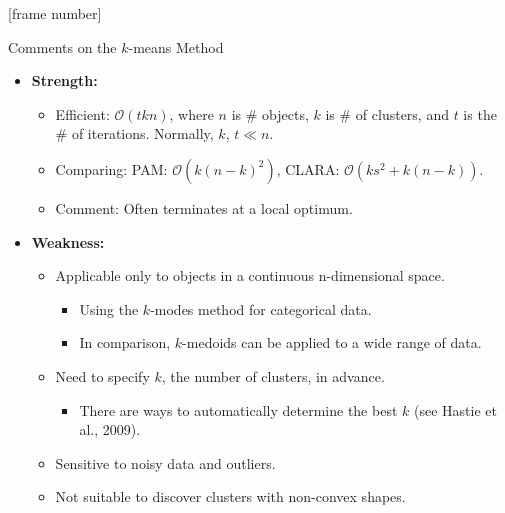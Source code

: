 \documentclass[aspectratio=169,t,xcolor=dvipsnames]{beamer}
\begin{document}
  {
    [frame number]
    \begin{frame}{Comments on the $k$-means Method}
      \begin{itemize}
        \item \textbf{Strength:}
        \begin{itemize}
          \item Efficient: $\mathcal{O}(tkn)$, where $n$ is $\#$ objects, $k$ is $\#$ of clusters, and $t$ is the $\#$ of iterations. Normally, $k$, $t \ll n$.
          \item Comparing: PAM: $\mathcal{O}(k(n-k)^2)$, CLARA: $\mathcal{O}(ks^2 + k(n-k))$.
          \item Comment: Often terminates at a local optimum.
        \end{itemize}
        \item \textbf{Weakness:}
        \begin{itemize}
          \item Applicable only to objects in a continuous n-dimensional space.
          \begin{itemize}
            \item Using the $k$-modes method for categorical data.
            \item In comparison, $k$-medoids can be applied to a wide range of data.
          \end{itemize}
          \item Need to specify $k$, the number of clusters, in advance.
          \begin{itemize}
            \item There are ways to automatically determine the best $k$ (see Hastie et al., 2009).
          \end{itemize}
          \item Sensitive to noisy data and outliers.
          \item Not suitable to discover clusters with non-convex shapes.
        \end{itemize}
      \end{itemize}
    \end{frame}
  }
\end{document}
